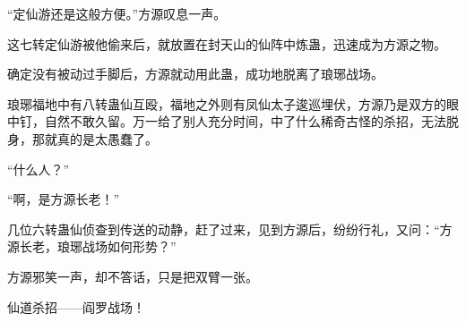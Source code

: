 \begin{this_body}
“定仙游还是这般方便。”方源叹息一声。

这七转定仙游被他偷来后，就放置在封天山的仙阵中炼蛊，迅速成为方源之物。

确定没有被动过手脚后，方源就动用此蛊，成功地脱离了琅琊战场。

琅琊福地中有八转蛊仙互殴，福地之外则有凤仙太子逡巡埋伏，方源乃是双方的眼中钉，自然不敢久留。万一给了别人充分时间，中了什么稀奇古怪的杀招，无法脱身，那就真的是太愚蠢了。

“什么人？”

“啊，是方源长老！”

几位六转蛊仙侦查到传送的动静，赶了过来，见到方源后，纷纷行礼，又问：“方源长老，琅琊战场如何形势？”

方源邪笑一声，却不答话，只是把双臂一张。

仙道杀招——阎罗战场！

\end{this_body}

